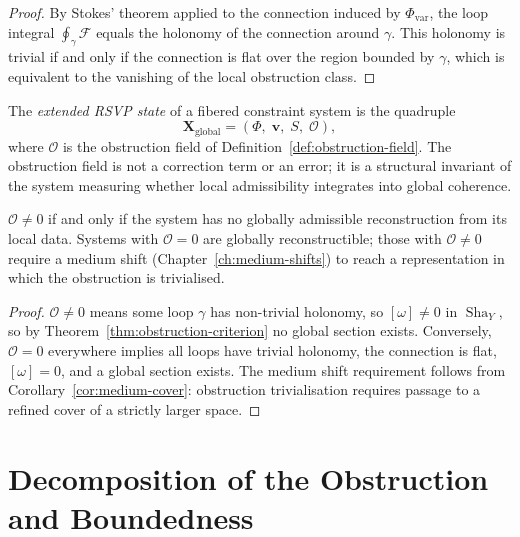 \documentclass[11pt,openany]{book}
\newcommand{\Sha}{\operatorname{Sha}}
\begin{document}
\begin{proof}
By Stokes' theorem applied to the connection induced by
$\Phi_{\mathrm{var}}$, the loop integral $\oint_\gamma
\mathcal{F}$ equals the holonomy of the connection around
$\gamma$.  This holonomy is trivial if and only if the
connection is flat over the region bounded by $\gamma$,
which is equivalent to the vanishing of the local
obstruction class.
\end{proof}

\begin{definition}
\label{def:extended-rsvp}
The \emph{extended RSVP state} of a fibered constraint
system is the quadruple
\[
  \mathbf{X}_{\mathrm{global}} =
    \left(\Phi,\; \boldsymbol{v},\; S,\; \mathcal{O}\right),
\]
where $\mathcal{O}$ is the obstruction field of
Definition~\ref{def:obstruction-field}.  The obstruction
field is not a correction term or an error; it is a
structural invariant of the system measuring whether local
admissibility integrates into global coherence.
\end{definition}

\begin{proposition}
\label{prop:obstruction-necessary}
$\mathcal{O} \neq 0$ if and only if the system has no
globally admissible reconstruction from its local data.
Systems with $\mathcal{O} = 0$ are globally reconstructible;
those with $\mathcal{O} \neq 0$ require a medium shift
(Chapter~\ref{ch:medium-shifts}) to reach a
representation in which the obstruction is trivialised.
\end{proposition}

\begin{proof}
$\mathcal{O} \neq 0$ means some loop $\gamma$ has
non-trivial holonomy, so $[\omega] \neq 0$ in $\Sha_Y$,
so by Theorem~\ref{thm:obstruction-criterion} no global
section exists.  Conversely, $\mathcal{O} = 0$ everywhere
implies all loops have trivial holonomy, the connection is
flat, $[\omega] = 0$, and a global section exists.  The
medium shift requirement follows from
Corollary~\ref{cor:medium-cover}: obstruction
trivialisation requires passage to a refined cover of a
strictly larger space.
\end{proof}

\section{Decomposition of the Obstruction and Boundedness}
\label{sec:obstruction-decomposition}
\end{document}
